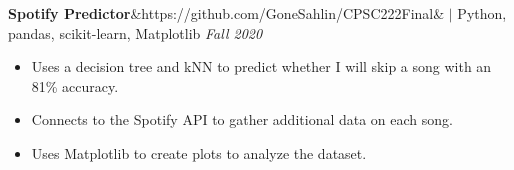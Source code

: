 \documentclass[11pt, a4paper, roman]{moderncv}
\newcommand{\project}[5]{
	\textbf{#1}\ifx&#2&{}
	\else
    		\href{#2}{\:\small\faGithub\:}\fi$|$ #3
	\hfill\textit{#4}
	#5
	\vspace{2mm}
}
\begin{document}
{\project{Spotify Predictor}{https://github.com/GoneSahlin/CPSC222Final}{Python, pandas, scikit-learn, Matplotlib}{Fall 2020}
	{\begin{itemize}
    		\item Uses a decision tree and kNN to predict whether I will skip a song with an 81\% accuracy.
    		\item Connects to the Spotify API to gather additional data on each song.
   		 \item Uses Matplotlib to create plots to analyze the dataset.
	\end{itemize}}
}





\end{document}
